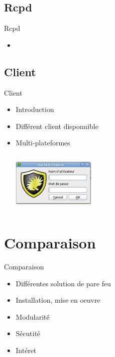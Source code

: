 \documentclass[t,12pt]{beamer}
\begin{document}
	  \subsection{Rcpd}
	  \begin{frame}{Rcpd}                                                         %
	      \begin{itemize}                                                   %
		\item
	  \end{itemize}
	  \end{frame} 

	  \subsection{Client}
	  \begin{frame}{Client}                                                         %
	      \begin{itemize}                                                   %
		\item Introduction
		\newline
		\item Différent client disponnible
		\newline
		\item Multi-plateformes
		\newline
		\begin{center}\includegraphics[width=4cm,height=3cm]{images/nuapp.png}\end{center}
	  \end{itemize}
	  \end{frame} 

\section{Comparaison}                                                    %
\begin{frame}{Comparaison}                                                         %
    \begin{itemize}                                                   %
	\item Différentes solution de pare feu
	\item Installation, mise en oeuvre
	\item Modularité
        \item Sécutité
        \item Intéret
\end{itemize}
\end{frame}                                                            %
\end{document}
